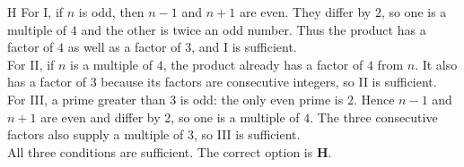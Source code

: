 \documentclass[11pt,a4paper]{article}
\begin{document}
\begin{enumerate}[label=\textbf{\arabic*.},leftmargin=*,itemsep=0pt,start=2]
\begin{djsSolution}{H}
For I, if $n$ is odd, then $n-1$ and $n+1$ are even. They differ by $2$, so one is a multiple of $4$ and the other is twice an odd number. Thus the product has a factor of $4$ as well as a factor of $3$, and I is sufficient.\\

For II, if $n$ is a multiple of $4$, the product already has a factor of $4$ from $n$. It also has a factor of $3$ because its factors are consecutive integers, so II is sufficient.\\

For III, a prime greater than $3$ is odd: the only even prime is $2$. Hence $n-1$ and $n+1$ are even and differ by $2$, so one is a multiple of $4$. The three consecutive factors also supply a multiple of $3$, so III is sufficient.\\

All three conditions are sufficient. The correct option is \textbf{H}.
\end{djsSolution}
\end{enumerate}
\clearpage
\thispagestyle{djssolutions}
\vspace*{8pt}
\end{document}
